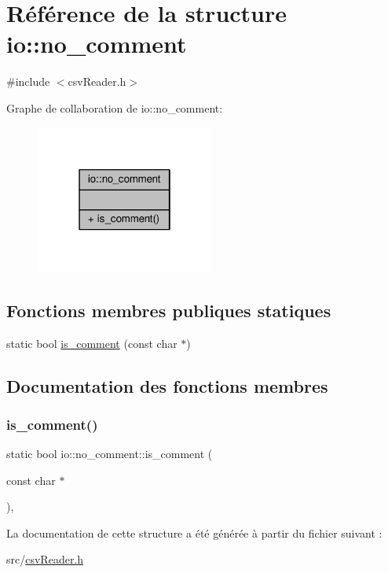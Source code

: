\hypertarget{structio_1_1no__comment}{}\section{Référence de la structure io\+:\+:no\+\_\+comment}
\label{structio_1_1no__comment}


{\ttfamily \#include $<$csv\+Reader.\+h$>$}



Graphe de collaboration de io\+:\+:no\+\_\+comment\+:\nopagebreak
\begin{figure}[H]
\begin{center}
\leavevmode
\includegraphics[width=166pt]{structio_1_1no__comment__coll__graph}
\end{center}
\end{figure}
\subsection*{Fonctions membres publiques statiques}
\begin{DoxyCompactItemize}
\item 
static bool \hyperlink{structio_1_1no__comment_a52b252547482e28edd076ee2224bc8d8}{is\+\_\+comment} (const char $\ast$)
\end{DoxyCompactItemize}


\subsection{Documentation des fonctions membres}
\mbox{\label{structio_1_1no__comment_a52b252547482e28edd076ee2224bc8d8}} 
\subsubsection{\texorpdfstring{is\+\_\+comment()}{is\_comment()}}
{\footnotesize\ttfamily static bool io\+::no\+\_\+comment\+::is\+\_\+comment (\begin{DoxyParamCaption}\item[{const char $\ast$}]{ }\end{DoxyParamCaption})\hspace{0.3cm}{\ttfamily [inline]}, {\ttfamily [static]}}



La documentation de cette structure a été générée à partir du fichier suivant \+:\begin{DoxyCompactItemize}
\item 
src/\hyperlink{csvReader_8h}{csv\+Reader.\+h}\end{DoxyCompactItemize}
